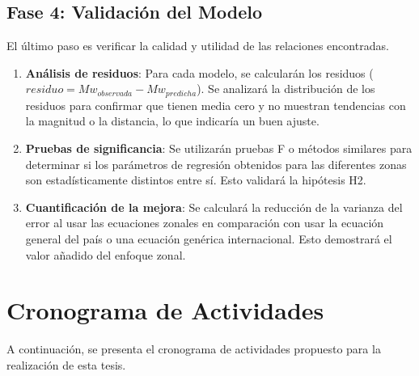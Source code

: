\documentclass[12pt,a4paper]{article}
\begin{document}
\subsection{Fase 4: Validación del Modelo}
El último paso es verificar la calidad y utilidad de las relaciones encontradas.
\begin{enumerate}
    \item \textbf{Análisis de residuos}: Para cada modelo, se calcularán los residuos ($residuo = Mw_{observada} - Mw_{predicha}$). Se analizará la distribución de los residuos para confirmar que tienen media cero y no muestran tendencias con la magnitud o la distancia, lo que indicaría un buen ajuste.
    \item \textbf{Pruebas de significancia}: Se utilizarán pruebas F o métodos similares para determinar si los parámetros de regresión obtenidos para las diferentes zonas son estadísticamente distintos entre sí. Esto validará la hipótesis H2.
    \item \textbf{Cuantificación de la mejora}: Se calculará la reducción de la varianza del error al usar las ecuaciones zonales en comparación con usar la ecuación general del país o una ecuación genérica internacional. Esto demostrará el valor añadido del enfoque zonal.
\end{enumerate}

\clearpage
\section{Cronograma de Actividades}
A continuación, se presenta el cronograma de actividades propuesto para la realización de esta tesis.
\end{document}
